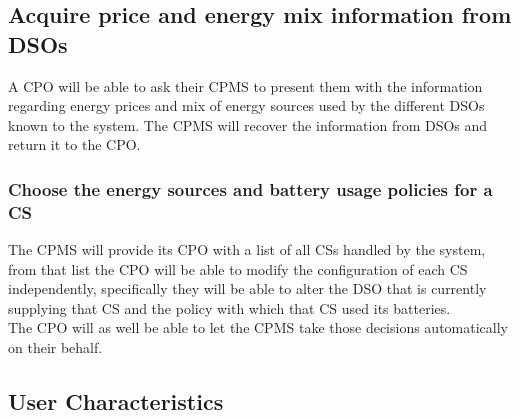 \documentclass[11pt]{article}
\begin{document}
\subsection{Acquire price and energy mix information from DSOs}

A CPO will be able to ask their CPMS to present them with the information regarding energy prices and mix of energy sources used by the different DSOs known to the system. The CPMS will recover the information from DSOs and return it to the CPO.

\subsubsection{Choose the energy sources and battery usage policies for a CS}

The CPMS will provide its CPO with a list of all CSs handled by the system, from that list the CPO will be able to modify the configuration of each CS independently, specifically they will be able to alter the DSO that is currently supplying that CS and the policy with which that CS used its batteries. \\
The CPO will as well be able to let the CPMS take those decisions automatically on their behalf.

\subsection{User Characteristics}
\end{document}
